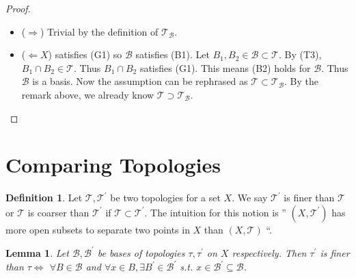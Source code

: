 \documentclass[
]{book}
\newtheorem{lemma}{Lemma}[chapter]
\theoremstyle{definition}
\newtheorem{definition}{Definition}[chapter]
\theoremstyle{definition}
\theoremstyle{definition}
\theoremstyle{definition}
\theoremstyle{remark}
\begin{document}
\begin{proof}
\leavevmode

\begin{itemize}
\item
  (\(\Rightarrow\)) Trivial by the definition of \(\mathcal{T}_{\mathcal{B}}\).
\item
  (\(\Leftarrow X\)) satisfies (G1) so \(\mathcal{B}\) satisfies (B1). Let \(B_{1}, B_{2} \in \mathcal{B} \subset \mathcal{T}\). By (T3), \(B_{1} \cap B_{2} \in \mathcal{T}\). Thus \(B_{1} \cap B_{2}\) satisfies (G1). This means (B2) holds for \(\mathcal{B}\). Thus \(\mathcal{B}\) is a basis. Now the assumption can be rephrased as \(\mathcal{T} \subset \mathcal{T}_{\mathcal{B}}\). By the remark above, we already know \(\mathcal{T} \supset \mathcal{T}_{\mathcal{B}}\).
\end{itemize}

\end{proof}

\hypertarget{comparing-topologies}{%
\section{Comparing Topologies}\label{comparing-topologies}}

\begin{definition}
\protect\hypertarget{def:unnamed-chunk-18}{}\label{def:unnamed-chunk-18}Let \(\mathcal{T}, \mathcal{T}^{\prime}\) be two topologies for a set \(X\). We say \(\mathcal{T}^{\prime}\) is finer than \(\mathcal{T}\) or \(\mathcal{T}\) is coarser than \(\mathcal{T}^{\prime}\) if \(\mathcal{T} \subset \mathcal{T}^{\prime}\). The intuition for this notion is '' \(\left(X, \mathcal{T}^{\prime}\right)\) has more open subsets to separate two points in \(X\) than \((X, \mathcal{T})\) ``.
\end{definition}

\begin{lemma}
\protect\hypertarget{lem:finerLemma}{}\label{lem:finerLemma}Let \(\mathcal{B}, \mathcal{B}^{\prime}\) be bases of topologies \(\tau, \tau^{\prime}\) on \(X\) respectively. Then \(\tau^{\prime}\) is finer than \(\tau \Leftrightarrow\) \(\forall B \in \mathcal{B}\) and \(\forall x \in B, \exists B^{\prime} \in \mathcal{B}^{\prime}\) s.t. \(x \in \mathcal{B}^{\prime} \subseteq \mathcal{B}\).
\end{lemma}
\end{document}

